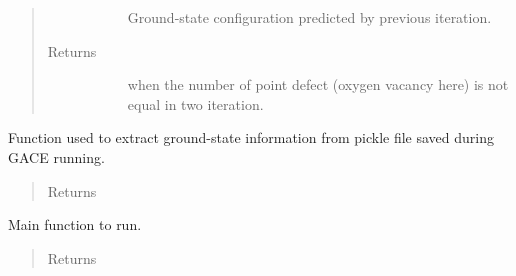 \documentclass[letterpaper,10pt,english]{sphinxmanual}
\begin{document}
\begin{fulllineitems}
\begin{fulllineitems}
\begin{quote}
\begin{description}
\begin{description}
\item[{}] \leavevmode
Ground-state configuration predicted by previous iteration.

\end{description}

\item[{Returns}] \leavevmode\begin{description}
\item[{}] \leavevmode
\item[{}] \leavevmode
\item[{}] \leavevmode
when the number of point defect (oxygen vacancy here) is not equal
in two iteration.

\end{description}

\end{description}\end{quote}

\end{fulllineitems}


\begin{fulllineitems}
\label{\detokenize{pygace:pygace.general_gace.Runner.print_gs}}
Function used to extract ground-state information from pickle file
saved during GACE running.
\begin{quote}\begin{description}
\item[{Returns}] \leavevmode\begin{description}
\item[{}] \leavevmode
\end{description}

\end{description}\end{quote}

\end{fulllineitems}


\begin{fulllineitems}
\label{\detokenize{pygace:pygace.general_gace.Runner.run}}
Main function to run.
\begin{quote}\begin{description}
\item[{Returns}] \leavevmode\begin{description}
\item[{}] \leavevmode
\end{description}


\end{description}
\end{quote}
\end{fulllineitems}
\end{fulllineitems}
\end{document}
